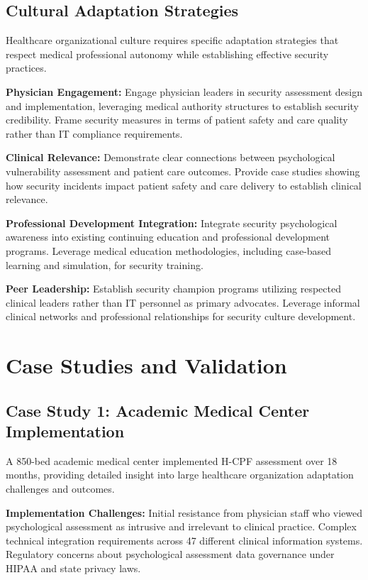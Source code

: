 \documentclass[10pt, twocolumn]{article}
\begin{document}
\subsection{Cultural Adaptation Strategies}

Healthcare organizational culture requires specific adaptation strategies that respect medical professional autonomy while establishing effective security practices.

\textbf{Physician Engagement:} Engage physician leaders in security assessment design and implementation, leveraging medical authority structures to establish security credibility. Frame security measures in terms of patient safety and care quality rather than IT compliance requirements.

\textbf{Clinical Relevance:} Demonstrate clear connections between psychological vulnerability assessment and patient care outcomes. Provide case studies showing how security incidents impact patient safety and care delivery to establish clinical relevance.

\textbf{Professional Development Integration:} Integrate security psychological awareness into existing continuing education and professional development programs. Leverage medical education methodologies, including case-based learning and simulation, for security training.

\textbf{Peer Leadership:} Establish security champion programs utilizing respected clinical leaders rather than IT personnel as primary advocates. Leverage informal clinical networks and professional relationships for security culture development.

\section{Case Studies and Validation}

\subsection{Case Study 1: Academic Medical Center Implementation}

A 850-bed academic medical center implemented H-CPF assessment over 18 months, providing detailed insight into large healthcare organization adaptation challenges and outcomes.

\textbf{Implementation Challenges:} Initial resistance from physician staff who viewed psychological assessment as intrusive and irrelevant to clinical practice. Complex technical integration requirements across 47 different clinical information systems. Regulatory concerns about psychological assessment data governance under HIPAA and state privacy laws.
\end{document}
